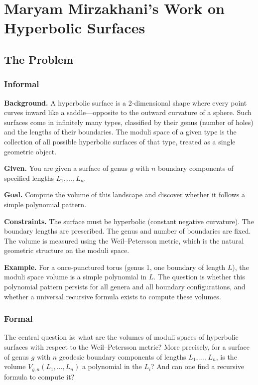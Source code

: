 \let\LocalMacro\relax

\chapter{Maryam Mirzakhani's Work on Hyperbolic Surfaces}

\section{The Problem}

\subsection{Informal}

\textbf{Background.} A hyperbolic surface is a 2-dimensional shape where every point curves inward like a saddle---opposite to the outward curvature of a sphere. Such surfaces come in infinitely many types, classified by their genus (number of holes) and the lengths of their boundaries. The moduli space of a given type is the collection of all possible hyperbolic surfaces of that type, treated as a single geometric object.

\textbf{Given.} You are given a surface of genus $g$ with $n$ boundary components of specified lengths $L_1, \ldots, L_n$.

\textbf{Goal.} Compute the volume of this landscape and discover whether it follows a simple polynomial pattern.

\textbf{Constraints.} The surface must be hyperbolic (constant negative curvature). The boundary lengths are prescribed. The genus and number of boundaries are fixed. The volume is measured using the Weil--Petersson metric, which is the natural geometric structure on the moduli space.

\textbf{Example.} For a once-punctured torus (genus 1, one boundary of length $L$), the moduli space volume is a simple polynomial in $L$. The question is whether this polynomial pattern persists for all genera and all boundary configurations, and whether a universal recursive formula exists to compute these volumes.

\subsection{Formal}

The central question is: what are the volumes of moduli spaces of hyperbolic surfaces with respect to the Weil--Petersson metric? More precisely, for a surface of genus $g$ with $n$ geodesic boundary components of lengths $L_1, \ldots, L_n$, is the volume $V_{g,n}(L_1, \ldots, L_n)$ a polynomial in the $L_i$? And can one find a recursive formula to compute it?

